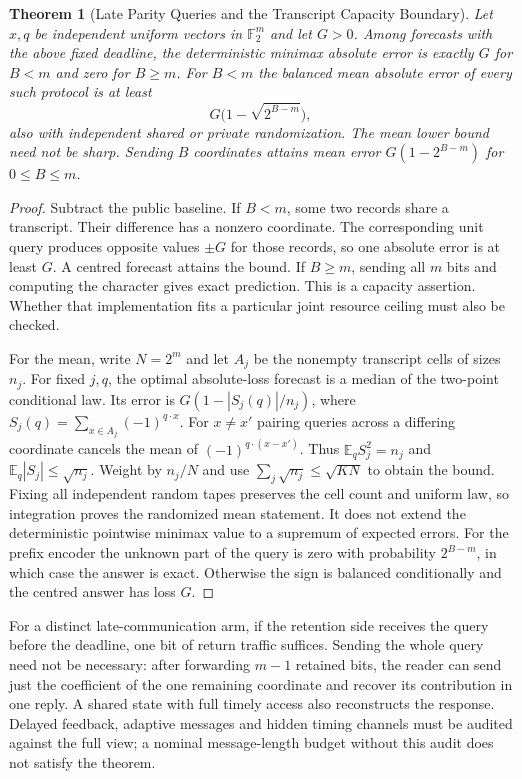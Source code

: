 \documentclass[11pt,a4paper]{article}
\newtheorem{theorem}{Theorem}[section]
\theoremstyle{definition}
\begin{document}
\begin{theorem}[Late Parity Queries and the Transcript Capacity Boundary]
\label{thm:late-parity-transcript}
Let $x,q$ be independent uniform vectors in $\mathbb F_2^m$ and let $G>0$.
Among forecasts with the above fixed deadline, the deterministic minimax
absolute error is exactly $G$ for $B<m$ and zero for $B\ge m$.
For $B<m$ the balanced mean absolute error of every such protocol is at least
\[
 G\bigl(1-\sqrt{2^{B-m}}\bigr),
\]
also with independent shared or private randomization. The mean lower bound
need not be sharp. Sending $B$ coordinates attains mean error
$G(1-2^{B-m})$ for $0\le B\le m$.
\end{theorem}

\begin{proof}
Subtract the public baseline. If $B<m$, some two records share a transcript.
Their difference has a nonzero coordinate. The corresponding unit query
produces opposite values $\pm G$ for those records, so one absolute error is
at least $G$. A centred forecast attains the bound. If $B\ge m$, sending
all $m$ bits and computing the character gives exact prediction. This is a
capacity assertion. Whether that implementation fits a particular joint
resource ceiling must also be checked.

For the mean, write $N=2^m$ and let $A_j$ be the nonempty transcript cells
of sizes $n_j$. For fixed $j,q$, the optimal absolute-loss forecast is a
median of the two-point conditional law. Its error is
$G(1-|S_j(q)|/n_j)$, where $S_j(q)=\sum_{x\in A_j}(-1)^{q\cdot x}$.
For $x\ne x'$ pairing queries across a differing coordinate cancels the
mean of $(-1)^{q\cdot(x-x')}$. Thus $\mathbb E_q S_j^2=n_j$ and
$\mathbb E_q|S_j|\le\sqrt{n_j}$. Weight by $n_j/N$ and use
$\sum_j\sqrt{n_j}\le\sqrt{KN}$ to obtain the bound. Fixing all independent
random tapes preserves the cell count and uniform law, so integration proves
the randomized mean statement. It does not extend the deterministic
pointwise minimax value to a supremum of expected errors.
For the prefix encoder the unknown part of the query is zero with
probability $2^{B-m}$, in which case the answer is exact. Otherwise the
sign is balanced conditionally and the centred answer has loss $G$.
\end{proof}

For a distinct late-communication arm, if the retention side receives the
query before the deadline, one bit of return traffic suffices. Sending the
whole query need not be necessary: after forwarding $m-1$ retained bits,
the reader can send just the coefficient of the one remaining coordinate
and recover its contribution in one reply. A shared state with full timely
access also reconstructs the response. Delayed feedback, adaptive messages
and hidden timing channels must be audited against the full view; a nominal
message-length budget without this audit does not satisfy the theorem.
\end{document}
